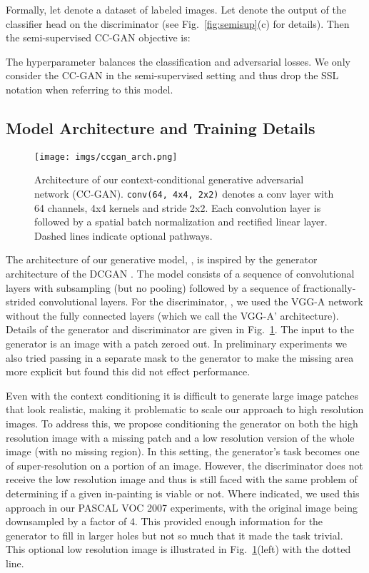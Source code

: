 \documentclass{article} \usepackage{iclr2017_conference,times}
\newcommand{\fig}[1]{Fig.~\ref{fig:#1}}
\begin{document}
Formally, let  denote a dataset of labeled images.
Let  denote the output of the classifier head on the discriminator (see \fig{semisup}(c) for details). 
Then the semi-supervised CC-GAN objective is: 


The hyperparameter  balances the classification and adversarial losses. 
We only consider the CC-GAN in the semi-supervised setting and thus drop the SSL notation when referring to this model. 

\subsection{Model Architecture and Training Details}

\begin{figure}[t]
\centering
 \texttt{[image: imgs/ccgan\_arch.png]} 
\caption{ Architecture of our context-conditional generative adversarial network (CC-GAN). \texttt{conv(64, 4x4, 2x2)} denotes a conv layer with 64 channels, 4x4 kernels and stride 2x2. Each convolution layer is followed by a spatial batch normalization and rectified linear layer. Dashed lines indicate optional pathways.
}
\vspace{-0.7em}
\label{fig:network}
\end{figure}

The architecture of our generative model, , is inspired by the
generator architecture of the DCGAN \citep{radford2016}.  The model
consists of a sequence of convolutional layers with subsampling (but
no pooling) followed by a sequence of fractionally-strided
convolutional layers.  For the discriminator, , we used the VGG-A
network \citep{vgg} without the fully connected layers (which we call
the VGG-A' architecture). Details of the
generator and discriminator are given in \fig{network}. The input to the generator is an image with a patch zeroed out. In preliminary
experiments we also tried passing in a separate mask to the generator
to make the missing area more explicit but found this did not effect
performance.

Even with the context conditioning it is difficult to generate large
image patches that look realistic, making it problematic to scale our
approach to high resolution images.  To address this, we propose
conditioning the generator on both the high resolution image with a
missing patch and a low resolution version of the whole image (with no
missing region).  
In this setting, the generator’s task becomes one of super-resolution on a portion of an image. 
However, the discriminator does not receive the low resolution image and thus is still faced with the same problem of determining if a given in-painting is viable or not. 
Where indicated, we used this approach in our PASCAL VOC 2007
experiments, with the original image being downsampled by a
factor of 4.  This provided enough information for the generator to
fill in larger holes but not so much that it made the task trivial.
This optional low resolution image is illustrated in
\fig{network}(left) with the dotted line.
\end{document}
